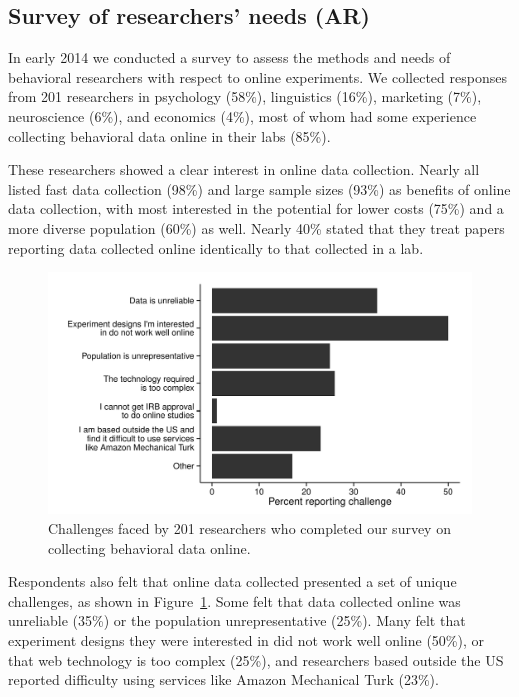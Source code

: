 \documentclass[twocolumn]{svjour3}          %
\begin{document}
\subsection{Survey of researchers' needs (AR)}

In early 2014 we conducted a survey to assess the methods and needs of behavioral researchers with
respect to online experiments.  We collected responses from 201 researchers in psychology (58\%),
linguistics (16\%), marketing (7\%), neuroscience (6\%), and economics (4\%), most of whom had some
experience collecting behavioral data online in their labs (85\%).

These researchers showed a clear interest in online data collection. Nearly all listed fast data
collection (98\%) and large sample sizes (93\%) as benefits of online data collection, with most
interested in the potential for lower costs (75\%) and a more diverse population (60\%) as well. Nearly
40\% stated that they treat papers reporting data collected online identically to that collected in
a lab.

\begin{figure}[tp]
\centering
\includegraphics[scale=.75]{figures/challenges.pdf}
\caption{Challenges faced by 201 researchers who completed our survey on collecting behavioral data online.}
\label{fig:challenges}
\end{figure}

Respondents also felt that online data collected presented a set of unique challenges, as shown in
Figure~\ref{fig:challenges}. Some felt that data collected online was unreliable (35\%) or the
population unrepresentative (25\%). Many felt that experiment designs they were interested in did
not work well online (50\%), or that web technology is too complex (25\%), and researchers based
outside the US reported difficulty using services like Amazon Mechanical Turk (23\%).
\end{document}
